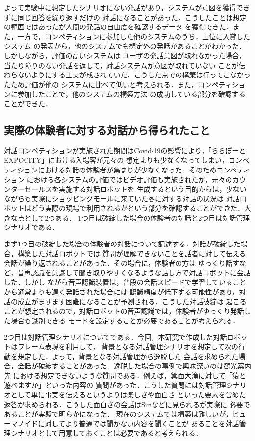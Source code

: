 よって実験中に想定したシナリオにない発話があり，システムが意図を獲得できずに同じ回答を繰り返すだけの
対話になることがあった．こうしたことは想定の範囲ではあったが人間の発話の自由度を確認するデータ
を獲得できた．また，一方で，コンペティションに参加した他のシステムのうち，上位に入賞したシステム
の発表から，他のシステムでも想定外の発話があることがわかった．しかしながら，評価の高いシステムは
ユーザの発話意図が取れなかった場合，当たり障りのない発話を返して，対話システムが意図が取れていない
ことが伝わらないようにする工夫が成されていた．こうした点での構築は行ってこなかったため評価が他の
システムに比べて低いと考えられる．また，コンペティションに参加したことで，他のシステムの構築方法
の成功している部分を確認することができた．



\subsection{実際の体験者に対する対話から得られたこと}
対話コンペティションが実施された期間はCovid-19の影響により，「ららぽーとEXPOCITY」における入場客が元々の
想定よりも少なくなってしまい，コンペティションにおける対話の体験者が集まりが少なくなった．そのためコンペティション
における各システムの評価ではビデオ評価も実施されたが，元々のカウンターセールスを実施する対話ロボットを
生成するという目的からは，少ないながらも実際にショッピングモールに来ていた客に対する対話の状況は
対話ロボットはどう実際の現場で利用されるかという部分を確認することができた．大きな点として2つある．
1つ目は破綻した場合の体験者の対話と2つ目は対話管理シナリオである．

まず1つ目の破綻した場合の体験者の対話について記述する．対話が破綻した場合，構築した対話ロボットでは
質問が理解できないことを話者に対して伝える会話が繰り返されることがあった．その場合に，体験者の方は
ゆっくり話すなど，音声認識を意識して聞き取りやすくなるような話し方で対話ロボットに会話した．しかし
ながら音声認識装置は，普段の会話スピードで学習していることから通常よりも遅く発話された場合には
認識精度が低下する可能性があり，対話の成立がますます困難になることが予測される．こうした対話破綻は
起こることが想定されるので，対話ロボットの音声認識では，体験者がゆっくり発話した場合も識別できる
モードを設定することが必要であることが考えられる．

2つ目は対話管理シナリオについてである．今回，本研究で作成した対話ロボットはフレーム表現を利用して，
背景となる対話管理シナリオを想定して次の行動を規定した．よって，背景となる対話管理から逸脱した
会話を求められた場合，会話が破綻することがあった．逸脱した場合の事例で興味深いのは観光案内先
における想定できないような質問である．例えば，箕面大滝に対して「猿と遊べますか」といった内容の
質問があった．こうした質問には対話管理シナリオとして単に事実を伝えるというよりは楽しさや面白さ
といった要素を含めた返答が求められる．こうした面白さの会話はSiriなどに見られるが実際に
必要であることが実験で明らかになった．
現在のシステムでは構築は難しいが，ヒューマノイドに対してより普通では聞かない内容を聞くことが
あることを対話管理シナリオとして用意しておくことは必要であると考えられる．




